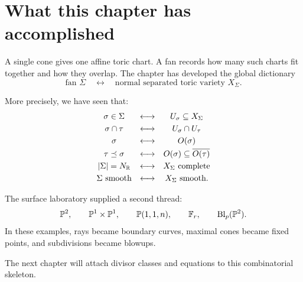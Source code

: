 \clearpage
\section*{What this chapter has accomplished}

A single cone gives one affine toric chart. A fan records how many such
charts fit together and how they overlap. The chapter has developed
the global dictionary
\[
\boxed{
\text{fan }\Sigma
\quad\longleftrightarrow\quad
\text{normal separated toric variety }X_\Sigma.
}
\]

More precisely, we have seen that:
\[
\begin{array}{c@{\quad\longleftrightarrow\quad}c}
\sigma\in\Sigma
&
U_\sigma\subseteq X_\Sigma
\\[1mm]
\sigma\cap\tau
&
U_\sigma\cap U_\tau
\\[1mm]
\sigma
&
O(\sigma)
\\[1mm]
\tau\preceq\sigma
&
O(\sigma)\subseteq\overline{O(\tau)}
\\[1mm]
|\Sigma|=N_{\RR}
&
X_\Sigma\text{ complete}
\\[1mm]
\Sigma\text{ smooth}
&
X_\Sigma\text{ smooth}.
\end{array}
\]

The surface laboratory supplied a second thread:
\[
\mathbb{P}^2,\qquad
\mathbb{P}^1\times\mathbb{P}^1,\qquad
\mathbb{P}(1,1,n),\qquad
\mathbb F_r,\qquad
\operatorname{Bl}_p(\mathbb{P}^2).
\]
In these examples, rays became boundary curves, maximal cones became
fixed points, and subdivisions became blowups.

The next chapter will attach divisor classes and equations to this
combinatorial skeleton.

